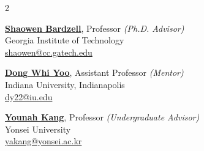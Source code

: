 \vspace{-0.4cm}

\begin{multicols}{2}

\noindent\href{http://shaowenbardzell.com}{\textbf{Shaowen Bardzell}}, Professor \textit{(Ph.D. Advisor)} \\ 
Georgia Institute of Technology\\ 
\href{mailto:shaowen@cc.gatech.edu}{shaowen@cc.gatech.edu}\\

\vspace{-0.2cm}

\noindent\href{https://www.dongwhiyoo.com}{\textbf{Dong Whi Yoo}}, Assistant Professor \textit{(Mentor)} \\ 
Indiana University, Indianapolis\\ 
\href{mailto:dy22@iu.edu}{dy22@iu.edu}\\

\vspace{-0.2cm}

\href{https://www.deylabyonsei.com/about}{\textbf{Younah Kang}}, Professor \textit{(Undergraduate Advisor)} \\ 
\indent Yonsei University\\
\indent \href{mailto:yakang@yonsei.ac.kr}{yakang@yonsei.ac.kr}\\

\vspace{-0.2cm}


\textcolor{white}{} \\
 \\
 \\


\end{multicols}